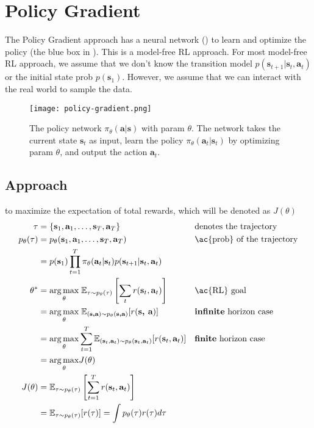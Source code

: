 \chapter{Policy Gradient}

The Policy Gradient approach has a neural network () to learn and optimize the policy (the blue box in ). This is a model-free \ac{RL} approach. For most model-free \ac{RL} approach, we assume that we don't know the transition model $p(\textbf{s}_{t+1} | \textbf{s}_t, \textbf{a}_t)$ or the initial state \ac{prob} $p(\textbf{s}_1)$. However, we assume that we can interact with the real world to sample the data.

\begin{figure}[hbt!]
	\centering
	\texttt{[image: policy-gradient.png]}
	\caption{The policy network $\pi_{\theta}(\textbf{a}|\textbf{s})$ with \ac{param} $\theta$. The network takes the current state $\textbf{s}_t$ as input, learn the policy $\pi_{\theta}(\textbf{a}_t|\textbf{s}_t)$ by optimizing \ac{param} $\theta$, and output the action $\textbf{a}_t$.}
	\label{fig:policy-gradient}
\end{figure}

\section{Approach}
 to maximize the expectation of total rewards, which will be denoted as $J(\theta)$
\begin{align}
	\tau & = \{ \textbf{s}_1, \textbf{a}_1, \dots, \textbf{s}_T, \textbf{a}_T \} && \text{denotes the trajectory}\\
	p_\theta(\tau) & = p_\theta(\textbf{s}_1, \textbf{a}_1, \dots, \textbf{s}_T, \textbf{a}_T) && \text{\ac{prob} of the trajectory} \label{eq:traj-prob}\\
	& = p(\textbf{s}_1) \prod_{t=1}^T \pi_{\theta}(\textbf{a}_t | \textbf{s}_t) p(\textbf{s}_{t+1} | \textbf{s}_t, \textbf{a}_t)\\
	\theta^* & = \underset{\theta}{\arg\max} \;\mathbb{E}_{\tau\sim p_\theta(\tau)} \left[ \sum_t r(\textbf{s}_t, \textbf{a}_t) \right] && \text{\ac{RL} goal}\\
	& = \underset{\theta}{\arg\max}\;\mathbb{E}_{(\textbf{s,a})\sim p_\theta(\textbf{s,a})} [r(\textbf{s, a})] && \text{\textbf{infinite} horizon case}\\
	& = \underset{\theta}{\arg\max} \sum_{t=1}^{T} \mathbb{E}_{(\textbf{s}_t,\textbf{a}_t)\sim p_\theta(\textbf{s}_t,\textbf{a}_t)} [r(\textbf{s}_t,\textbf{a}_t)] && \text{\textbf{finite} horizon case}\\
	& = \underset{\theta}{\arg\max} J(\theta)\\
	J(\theta) & = \mathbb{E}_{\tau\sim p_\theta(\tau)} \left[ \sum_{t=1}^T r(\textbf{s}_t, \textbf{a}_t) \right]\\
	& = \mathbb{E}_{\tau\sim p_\theta(\tau)} [r(\tau)] = \int p_\theta(\tau) r(\tau) d\tau
\end{align}

